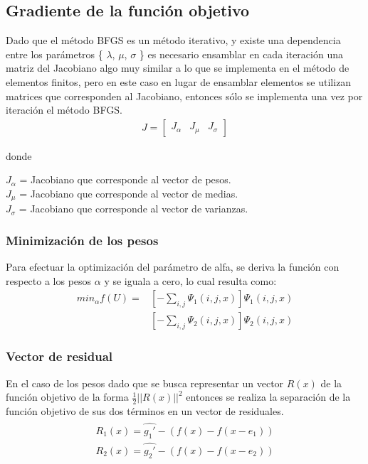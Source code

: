 \subsection{Gradiente de la función objetivo}
Dado que el método BFGS es un método iterativo, y existe una dependencia entre los parámetros \{ $\lambda$, $\mu$, $\sigma$ \} es necesario ensamblar en cada iteración una matriz del Jacobiano algo muy similar a lo que se implementa en el método de elementos finitos, pero en este caso en lugar de ensamblar elementos se utilizan matrices que corresponden al Jacobiano, entonces sólo se implementa una vez por iteración el método BFGS.
\begin{equation} \label{JACOBIANO}
\begin{split}
J = \begin{bmatrix}
	   	J_{\alpha} &    
		J_{\mu} &
		J_{\sigma}      
           \end{bmatrix}
\end{split}
\end{equation}

donde

$J_{\alpha}$ = Jacobiano que corresponde al vector de pesos.\\
$J_{\mu}$ = Jacobiano que corresponde al vector de medias.\\
$J_{\sigma}$ = Jacobiano que corresponde al vector de varianzas.


\subsubsection{Minimizaci\'on de los pesos}
Para efectuar la optimizaci\'on del par\'ametro de alfa, se deriva la funci\'on con respecto a los pesos $\alpha$ y se iguala a cero,  lo cual resulta como:
\begin{equation}
\begin{split}
min_\alpha f(U)=&
 \left [  - \sum_{i,j} \Psi_1(i,j, x)\right]\Psi_1(i,j, x) \\ & \left [ - \sum_{i,j} \Psi_2(i,j, x) \right ] \Psi_2(i,j, x)	
\end{split} 	
\end{equation}
\subsubsection{Vector de residual}
En el caso de los pesos dado que se busca representar un vector $R(x)$ de la funci\'on objetivo de la forma $\frac{1}{2}||R(x)||^2$ entonces se realiza la separaci\'on de la funci\'on objetivo de sus dos t\'erminos en un vector de residuales.
 \begin{align}
 \begin{split} \label{Vector_Residuales}
 R_1(x) = \widehat{g_1'}-(f(x)- f(x-e_1))\\
 R_2(x) = \widehat{g_2'}-(f(x)- f(x-e_2))\\ 
 \end{split}
 \end{align}
